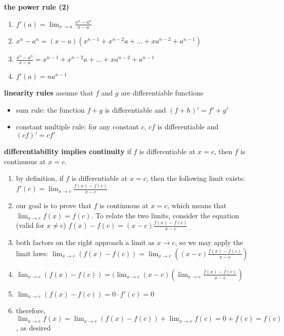 \documentclass{article}
\begin{document}
\textbf{the power rule (2)}
	\begin{enumerate}
		\item $f'(a) = \lim_{x \to a}\frac{x^n - a^n}{x - a}$
		\item $x^n - a^n = (x - a)(x^{n-1} + x^{n-2}a + \ldots + xa^{n-2} + a^{n-1})$
		\item $\frac{x^n - a^n}{x - a} = x^{n-1} + x^{n-2}a + \ldots + xa^{n-2} + a^{n-1}$ 
		\item $f'(a) = na^{n-1}$
	\end{enumerate}

\textbf{linearity rules} assume that $f$ and $g$ are differentiable functions
	\begin{itemize}
		\item sum rule: the function $f + g$ is differentiable and $(f + h)' = f' + g'$
		\item constant multiple rule: for any constant $c$, $cf$ is differentiable and $(cf)' = cf'$
	\end{itemize}

\textbf{differentiability implies continuity} if $f$ is differentiable at $x = c$, then $f$ is continuous at $x = c$.\\
	\begin{enumerate}
		\item by definition, if $f$ is differentiable at $x = c$, then the following limit exists: $f'(c) = \lim_{x \to c}\frac{f(x) - f(c)}{x - c}$
		\item our goal is to prove that $f$ is continuous at $x = c$, which means that $\lim_{x \to c}f(x) = f(c)$. To relate the two limits, consider the equation (valid for $x \neq c$) $f(x) - f(c) = (x - c)\frac{f(x) - f(c)}{x - c}$
		\item both factors on the right approach a limit as $x \to c$, so we may apply the limit laws: $\lim_{x \to c}(f(x) - f(c)) = \lim_{x \to c}((x - c)\frac{f(x) - f(c)}{x - c})$
		\item $\lim_{x \to c}(f(x) - f(c)) = (\lim_{x \to c}(x - c)(\lim_{x \to c}\frac{f(x) - f(c)}{x - c})$
		\item $\lim_{x \to c}(f(x) - f(c)) = 0 \cdot f'(c) = 0$
		\item therefore, $\lim_{x \to c}f(x) = \lim_{x \to c}(f(x) - f(c)) + \lim_{x \to c}f(c) = 0 + f(c) = f(c)$, as desired
	\end{enumerate}
\end{document}
